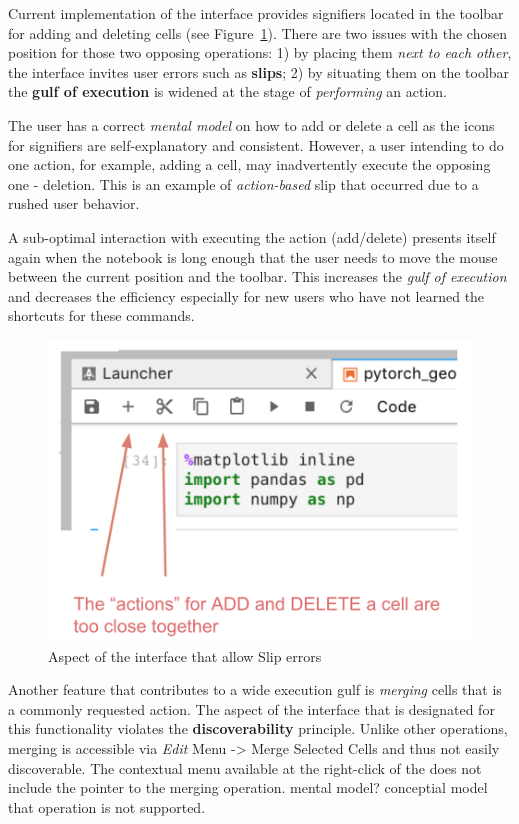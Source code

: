 \documentclass[12pt,letterpaper]{article}
\begin{document}
Current implementation of the interface provides signifiers located in the toolbar for adding and deleting cells (see Figure~\ref{fig::2}). There are two issues with the chosen position for those two opposing operations: 1) by placing them \textit{next to each other}, the interface invites user errors such as \textbf{slips}; 2) by situating them on the toolbar the \textbf{gulf of execution} is widened at the stage of \textit{performing} an action.

The user has a correct \textit{mental model} on how to add or delete a cell as the icons for signifiers are self-explanatory and consistent. However, a user intending to do one action, for example, adding a cell, may inadvertently execute the opposing one - deletion. This is an example of \textit{action-based} slip that occurred due to a rushed user behavior. 

A sub-optimal interaction with executing the action (add/delete) presents itself again when the notebook is long enough that the user needs to move the mouse between the current position and the toolbar. This increases the \textit{gulf of execution} and decreases the efficiency especially for new users who have not learned the shortcuts for these commands.  

\begin{figure}[h]
\centering
\includegraphics[scale=.4]{figures/project-principles/jupyter_add_delete.png}
\caption{Aspect of the interface that allow Slip errors}
\label{fig::2}
\end{figure}

Another feature that contributes to a wide execution gulf is \textit{merging} cells that is a commonly requested action. The aspect of the interface that is designated for this functionality violates the \textbf{discoverability} principle. Unlike other operations, merging is accessible via \textit{Edit} Menu -> Merge Selected Cells and thus not easily discoverable. The contextual menu available at the right-click of the does not include the pointer to the merging operation. mental model? conceptial model that operation is not supported.
\end{document}
